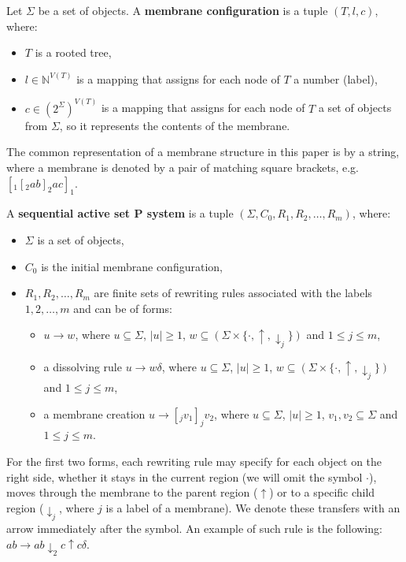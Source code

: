 Let $\Sigma$ be a set of objects. A {\bf membrane configuration} is a tuple $(T, l, c)$, where:
\begin{itemize}
  \item $T$ is a rooted tree,
  \item $l\in\mathbb N^{V(T)}$ is a mapping that assigns for each node of $T$ a number (label),
  \item $c\in(2^\Sigma)^{V(T)}$ is a mapping that assigns for each node of $T$ a set of objects from $\Sigma$, so it represents the contents of the membrane.
\end{itemize}

The common representation of a membrane structure in this paper is by a string, where a membrane is denoted by a pair of matching square brackets, e.g. $[_1 [_2 ab ]_2 ac ]_1$.

A {\bf sequential active set P system} is a tuple $(\Sigma, C_0, R_1, R_2, \dots , R_m)$, where:
\begin{itemize}
  \item $\Sigma$ is a set of objects,
  \item $C_0$ is the initial membrane configuration,
  \item $R_1,R_2,\dots, R_m$ are finite sets of rewriting rules associated with the labels $1,2,\dots,m$ and can be of forms:
  \begin{itemize}
    \item $u\rightarrow w$, where $u\subseteq \Sigma$, $|u|\geq 1$, $w\subseteq (\Sigma\times\{\cdot, \uparrow, \downarrow_j\})$ and $1\leq j\leq m$,
    \item a dissolving rule $u\rightarrow w\delta$, where $u\subseteq \Sigma$, $|u|\geq 1$, $w\subseteq (\Sigma\times\{\cdot, \uparrow, \downarrow_j\})$ and $1\leq j\leq m$,
    \item a membrane creation $u\rightarrow [_j v_1]_j v_2$, where $u\subseteq \Sigma$, $|u|\geq 1$, $v_1, v_2\subseteq \Sigma$ and $1\leq j\leq m$.
  \end{itemize}
\end{itemize}

For the first two forms, each rewriting rule may specify for each object on the right side, whether it stays in the current region (we will omit the symbol $\cdot$), moves through the membrane to the parent region ($\uparrow$)
or to a specific child region ($\downarrow_j$, where $j$ is a label of a membrane).
We denote these transfers with an arrow immediately after the symbol.
An example of such rule is the following: $ab\rightarrow ab\downarrow_2 c\uparrow c\delta$.

